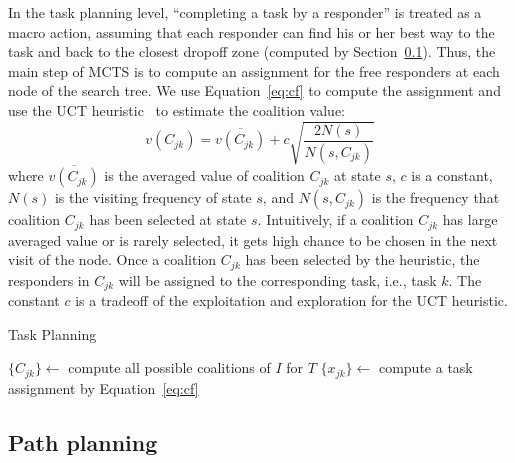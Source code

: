 In the task planning level, ``completing a task by a responder'' is
treated as a macro action, assuming that each responder can find
his or her best way to the task and back to the closest dropoff
zone (computed by Section~\ref{sec:pathplanning}). Thus, the main
step of MCTS is to compute an assignment for the free responders at
each node of the search tree. We use Equation~\ref{eq:cf} to
compute the assignment and use the UCT heuristic~\cite{?} to
estimate the coalition value:
\begin{equation}
  v(C_{jk}) = \overline{v(C_{jk})} + c\sqrt{\frac{2N(s)}{N(s, C_{jk})}}
\end{equation}
where $\overline{v(C_{jk})}$ is the averaged value of coalition
$C_{jk}$ at state $s$, $c$ is a constant, $N(s)$ is the visiting
frequency of state $s$, and $N(s, C_{jk})$ is the frequency that
coalition $C_{jk}$ has been selected at state $s$. Intuitively, if
a coalition $C_{jk}$ has large averaged value or is rarely
selected, it gets high chance to be chosen in the next visit of the
node. Once a coalition $C_{jk}$ has been selected by the heuristic,
the responders in $C_{jk}$ will be assigned to the corresponding
task, i.e., task $k$. The constant $c$ is a tradeoff of the
exploitation and exploration for the UCT heuristic.

\begin{algorithm}[t]
  \caption{Task Planning}
  $\{ C_{jk} \} \gets$ compute all possible coalitions of $I$ for
  $T$ \;
  $\{ x_{jk} \} \gets$ compute a task assignment by
  Equation~\ref{eq:cf} \;
\end{algorithm}


\subsection{Path planning}
\label{sec:pathplanning}

